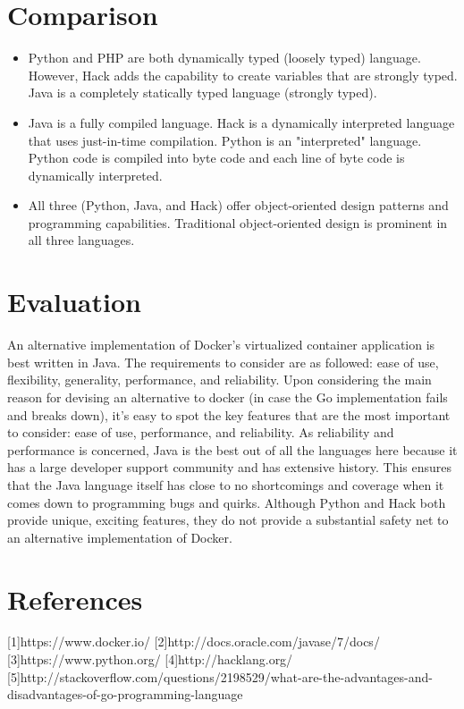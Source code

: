\documentclass[letterpaper,twocolumn,10pt]{article}
\begin{document}
\section{Comparison}
\begin{itemize}
\item
Python and PHP are both dynamically typed (loosely typed) language. However, Hack adds the capability to create variables that are strongly typed. Java is a completely statically typed language (strongly typed).
\item
Java is a fully compiled language. Hack is a dynamically interpreted language that uses just-in-time compilation. Python is an "interpreted" language. Python code is compiled into byte code and each line of byte code is dynamically interpreted.
\item
All three (Python, Java, and Hack) offer object-oriented design patterns and programming capabilities. Traditional object-oriented design is prominent in all three languages. 
\end{itemize}

\section{Evaluation}
An alternative implementation of Docker's virtualized container application is best written in Java. The requirements to consider are as followed: ease of use, flexibility, generality, performance, and reliability. Upon considering the main reason for devising an alternative to docker (in case the Go implementation fails and breaks down), it's easy to spot the key features that are the most important to consider: ease of use, performance, and reliability.  As reliability and
performance is concerned, Java is the best out of all the languages here because it has a large developer support community and has extensive history. This ensures that the Java language itself has close to no shortcomings and coverage when it comes down to programming bugs and quirks. Although Python and Hack both provide unique, exciting features, they do not provide a substantial safety net to an alternative implementation of Docker.

\section{References}
[1]https://www.docker.io/
[2]http://docs.oracle.com/javase/7/docs/
[3]https://www.python.org/
[4]http://hacklang.org/
[5]http://stackoverflow.com/questions/2198529/what-are-the-advantages-and-disadvantages-of-go-programming-language
\end{document}
